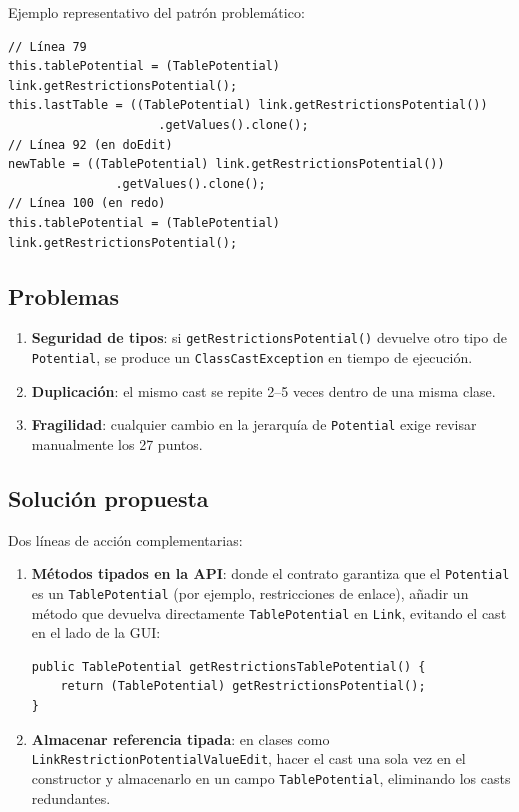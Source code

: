 \documentclass[12pt,a4paper]{article}
\newcommand{\code}[1]{\texttt{#1}}
\newcommand{\clase}[1]{\texttt{#1}}
\newcommand{\metodo}[1]{\texttt{#1}}
\newcommand{\bad}[1]{\textcolor{codered}{\textbf{#1}}}
\newcommand{\warn}[1]{\textcolor{warnorange}{\textbf{#1}}}
\begin{document}
Ejemplo representativo del patrón problemático:

\begin{lstlisting}[caption={Casts encadenados en \clase{LinkRestrictionPotentialValueEdit}}]
// Línea 79
this.tablePotential = (TablePotential) link.getRestrictionsPotential();
this.lastTable = ((TablePotential) link.getRestrictionsPotential())
                     .getValues().clone();
// Línea 92 (en doEdit)
newTable = ((TablePotential) link.getRestrictionsPotential())
               .getValues().clone();
// Línea 100 (en redo)
this.tablePotential = (TablePotential) link.getRestrictionsPotential();
\end{lstlisting}

\subsection{Problemas}

\begin{enumerate}
  \item \bad{Seguridad de tipos}: si \metodo{getRestrictionsPotential()}
        devuelve otro tipo de \clase{Potential}, se produce un
        \code{ClassCastException} en tiempo de ejecución.
  \item \warn{Duplicación}: el mismo cast se repite 2--5 veces dentro
        de una misma clase.
  \item \warn{Fragilidad}: cualquier cambio en la jerarquía de
        \clase{Potential} exige revisar manualmente los 27 puntos.
\end{enumerate}

\subsection{Solución propuesta}

Dos líneas de acción complementarias:

\begin{enumerate}
  \item \textbf{Métodos tipados en la API}: donde el contrato garantiza
        que el \clase{Potential} es un \clase{TablePotential} (por
        ejemplo, restricciones de enlace), añadir un método que devuelva
        directamente \code{TablePotential} en \clase{Link}, evitando el
        cast en el lado de la GUI:
\begin{lstlisting}[caption={Método tipado propuesto en \clase{Link}}]
public TablePotential getRestrictionsTablePotential() {
    return (TablePotential) getRestrictionsPotential();
}
\end{lstlisting}
  \item \textbf{Almacenar referencia tipada}: en clases como
        \clase{LinkRestrictionPotentialValueEdit}, hacer el cast una
        sola vez en el constructor y almacenarlo en un campo
        \code{TablePotential}, eliminando los casts redundantes.
\end{enumerate}
\end{document}
